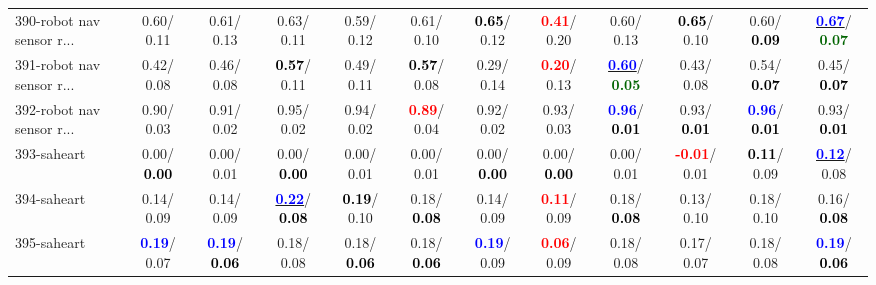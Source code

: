 \begin{table}[h]
\begin{center}
{\begin{tabular}{lc|c|c|c|c|c|c|c|c|c|c}
390-robot nav sensor r... &   0.60/  0.11 &   0.61/  0.13 &   0.63/  0.11 &   0.59/  0.12 &   0.61/  0.10 & \textcolor{black}{\textbf{  0.65}}/  0.12 & \textcolor{red}{\textbf{  0.41}}/  0.20 &   0.60/  0.13 & \textcolor{black}{\textbf{  0.65}}/  0.10 &   0.60/\textcolor{black}{\textbf{  0.09}} & \underline{\textcolor{blue}{\textbf{  0.67}}}/\textcolor{darkgreen}{\textbf{  0.07}} \\
391-robot nav sensor r... &   0.42/  0.08 &   0.46/  0.08 & \textcolor{black}{\textbf{  0.57}}/  0.11 &   0.49/  0.11 & \textcolor{black}{\textbf{  0.57}}/  0.08 &   0.29/  0.14 & \textcolor{red}{\textbf{  0.20}}/  0.13 & \underline{\textcolor{blue}{\textbf{  0.60}}}/\textcolor{darkgreen}{\textbf{  0.05}} &   0.43/  0.08 &   0.54/\textcolor{black}{\textbf{  0.07}} &   0.45/\textcolor{black}{\textbf{  0.07}} \\ \hline
392-robot nav sensor r... &   0.90/  0.03 &   0.91/  0.02 &   0.95/  0.02 &   0.94/  0.02 & \textcolor{red}{\textbf{  0.89}}/  0.04 &   0.92/  0.02 &   0.93/  0.03 & \textcolor{blue}{\textbf{  0.96}}/\textcolor{black}{\textbf{  0.01}} &   0.93/\textcolor{black}{\textbf{  0.01}} & \textcolor{blue}{\textbf{  0.96}}/\textcolor{black}{\textbf{  0.01}} &   0.93/\textcolor{black}{\textbf{  0.01}} \\
393-saheart &   0.00/\textcolor{black}{\textbf{  0.00}} &   0.00/  0.01 &   0.00/\textcolor{black}{\textbf{  0.00}} &   0.00/  0.01 &   0.00/  0.01 &   0.00/\textcolor{black}{\textbf{  0.00}} &   0.00/\textcolor{black}{\textbf{  0.00}} &   0.00/  0.01 & \textcolor{red}{\textbf{ -0.01}}/  0.01 & \textcolor{black}{\textbf{  0.11}}/  0.09 & \underline{\textcolor{blue}{\textbf{  0.12}}}/  0.08 \\
394-saheart &   0.14/  0.09 &   0.14/  0.09 & \underline{\textcolor{blue}{\textbf{  0.22}}}/\textcolor{black}{\textbf{  0.08}} & \textcolor{black}{\textbf{  0.19}}/  0.10 &   0.18/\textcolor{black}{\textbf{  0.08}} &   0.14/  0.09 & \textcolor{red}{\textbf{  0.11}}/  0.09 &   0.18/\textcolor{black}{\textbf{  0.08}} &   0.13/  0.10 &   0.18/  0.10 &   0.16/\textcolor{black}{\textbf{  0.08}} \\
395-saheart & \textcolor{blue}{\textbf{  0.19}}/  0.07 & \textcolor{blue}{\textbf{  0.19}}/\textcolor{black}{\textbf{  0.06}} &   0.18/  0.08 &   0.18/\textcolor{black}{\textbf{  0.06}} &   0.18/\textcolor{black}{\textbf{  0.06}} & \textcolor{blue}{\textbf{  0.19}}/  0.09 & \textcolor{red}{\textbf{  0.06}}/  0.09 &   0.18/  0.08 &   0.17/  0.07 &   0.18/  0.08 & \textcolor{blue}{\textbf{  0.19}}/\textcolor{black}{\textbf{  0.06}} \\

\end{tabular}}
\end{center}
\end{table}
